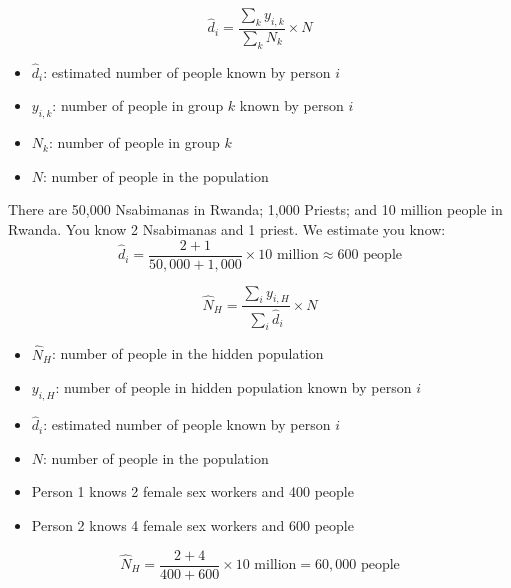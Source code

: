 \documentclass[aspectratio=169]{beamer}
\begin{document}
\begin{frame}

\begin{equation*}
\hat{d}_i = \frac{\sum_k  y_{i,k}}{\sum_k N_k} \times N
\end{equation*}
\small{
\begin{itemize}
\item $\hat{d}_i$: estimated number of people known by person $i$
\item $y_{i,k}$: number of people in group $k$ known by person $i$
\item $N_k$: number of people in group $k$
\item $N$: number of people in the population
\end{itemize}
}

There are 50,000 Nsabimanas in Rwanda; 1,000 Priests; and 10 million people in Rwanda.  You know 2 Nsabimanas and 1 priest.  We estimate you know:
\pause
\begin{equation*}
\hat{d}_i = \frac{2 + 1}{50,000 + 1,000} \times 10 \mbox{ million} \approx 600 \mbox{ people} 
\end{equation*}

\end{frame}
\begin{frame}

\begin{equation*}
\hat{N}_H = \frac{\sum_i y_{i,H}}{\sum_i \hat{d}_i} \times N
\end{equation*}
\small{
\begin{itemize}
\item $\hat{N}_H$: number of people in the hidden population
\item $y_{i,H}$: number of people in hidden population known by person $i$
\item $\hat{d}_i$: estimated number of people known by person $i$
\item $N$: number of people in the population
\end{itemize}
}

\begin{itemize}
\item Person 1 knows 2 female sex workers and 400 people
\item Person 2 knows 4 female sex workers and 600 people
\end{itemize}
\pause
\begin{equation*}
\hat{N}_H  = \frac{2 + 4}{400 + 600} \times 10 \mbox{ million} = 60,000 \mbox{ people} 
\end{equation*}

\end{frame}
\end{document}
